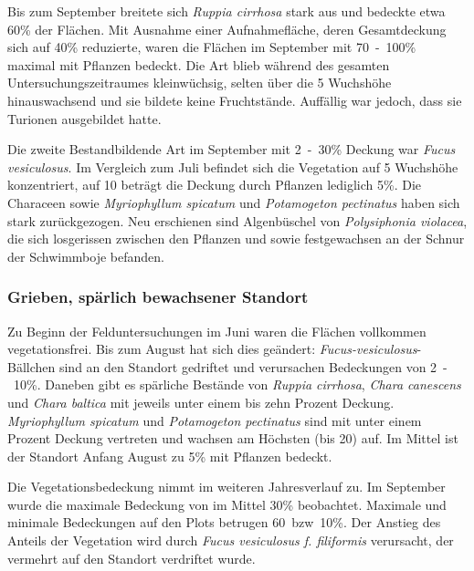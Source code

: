 Bis zum September breitete sich \textit{Ruppia cirrhosa} stark aus und bedeckte etwa \unit{60}{\%} der Flächen. Mit Ausnahme einer Aufnahmefläche, deren Gesamtdeckung sich auf \unit{40}{\%} reduzierte, waren die Flächen im September mit \unit{70-100}{\%} maximal mit Pflanzen bedeckt. Die Art blieb während des gesamten Untersuchungszeitraumes kleinwüchsig, selten über die \unit{5}{\centi\metre} Wuchshöhe hinauswachsend und sie bildete keine Fruchtstände. Auffällig war jedoch, dass sie Turionen ausgebildet hatte.

Die zweite Bestandbildende Art im September mit \unit{2-30}{\%} Deckung war \textit{Fucus vesiculosus}. Im Vergleich zum Juli befindet sich die Vegetation auf \unit{5}{\centi\metre} Wuchshöhe konzentriert, auf \unit{10}{\centi\metre} beträgt die Deckung durch Pflanzen lediglich \unit{5}{\%}. Die Characeen sowie \textit{Myriophyllum spicatum} und \textit{Potamogeton pectinatus} haben sich stark zurückgezogen. Neu erschienen sind Algenbüschel von \textit{Polysiphonia violacea}, die sich losgerissen zwischen den Pflanzen und sowie festgewachsen an der Schnur der Schwimmboje befanden. 



\subsubsection{Grieben, spärlich bewachsener Standort}


Zu Beginn der Felduntersuchungen im Juni waren die Flächen vollkommen vegetationsfrei. Bis zum August hat sich dies geändert: \textit{Fucus-vesiculosus}-Bällchen sind an den Standort gedriftet und verursachen Bedeckungen von \unit{2-10}{\%}. Daneben gibt es spärliche Bestände von \textit{Ruppia cirrhosa}, \textit{Chara canescens} und \textit{Chara baltica} mit jeweils unter einem bis zehn Prozent Deckung. \textit{Myriophyllum spicatum} und \textit{Potamogeton pectinatus} sind mit unter einem Prozent Deckung vertreten und wachsen am Höchsten (bis \unit{20}{\centi\metre}) auf. Im Mittel ist der Standort Anfang August zu \unit{5}{\%} mit Pflanzen bedeckt.

Die Vegetationsbedeckung nimmt im weiteren Jahresverlauf zu. Im September wurde die maximale Bedeckung von im Mittel \unit{30}{\%} beobachtet. Maximale und minimale Bedeckungen auf den Plots betrugen \unit{60 bzw. 10}{\%}. Der Anstieg des Anteils der Vegetation wird durch \textit{Fucus vesiculosus f. filiformis }verursacht, der vermehrt auf den Standort verdriftet wurde.\\



